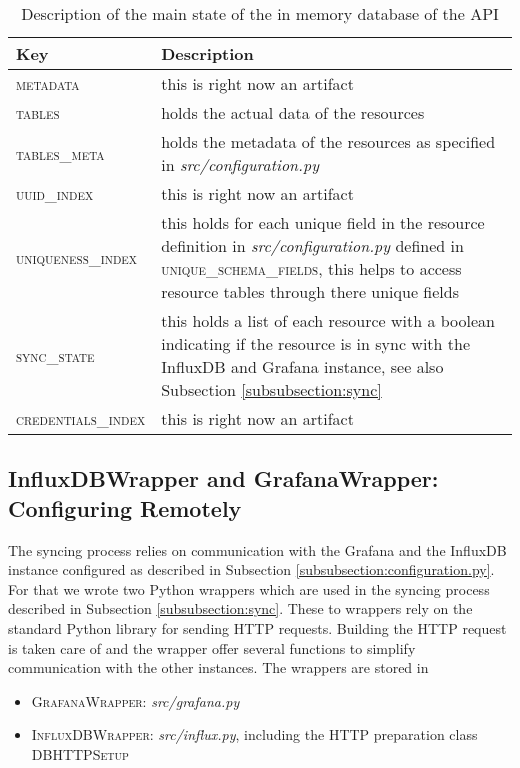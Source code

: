 \begin{table}
	\begin{tabular}{ p{3cm}| p{8cm}  }
		Key  & Description \\\hline\hline
		\textsc{metadata} & this is right now an artifact \\\hline	
		\textsc{tables} & holds the actual data of the resources  \\\hline	
		\textsc{tables\_meta} & holds the metadata of the resources as specified in \textit{src/configuration.py} \\\hline	
		\textsc{uuid\_index} & this is right now an artifact \\\hline	
		\textsc{uniqueness\_index} & this holds for each unique field in the resource definition in \textit{src/configuration.py} defined in \textsc{unique\_schema\_fields}, this helps to access resource tables through there unique fields \\\hline	
		\textsc{sync\_state} & this holds a list of each resource with a boolean indicating if the resource is in sync with the InfluxDB and Grafana instance, see also Subsection \ref{subsubsection:sync}\\\hline	
		\textsc{credentials\_index} & this is right now an artifact \\\hline	
	\end{tabular}
	\caption{Description of the main state of the in memory database of the API}\label{table:mainstate}
\end{table}


\subsection{InfluxDBWrapper and GrafanaWrapper: Configuring Remotely}\label{subsection.wrapper}
The syncing process relies on communication with the Grafana and the InfluxDB instance configured as described in Subsection \ref{subsubsection:configuration.py}. For that we wrote two Python wrappers which are used in the syncing process described in Subsection \ref{subsubsection:sync}. These to wrappers rely on the standard Python library for sending HTTP requests. Building the HTTP request is taken care of and the wrapper offer several functions to simplify communication with the other instances. The wrappers are stored in
\begin{itemize}
	\item \textsc{GrafanaWrapper}: \textit{src/grafana.py}
	\item \textsc{InfluxDBWrapper}: \textit{src/influx.py}, including the HTTP preparation class \textsc{DBHTTPSetup}
\end{itemize}

